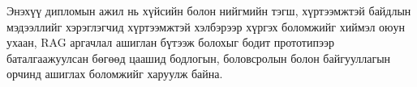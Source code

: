 Энэхүү дипломын ажил нь хүйсийн болон нийгмийн тэгш, хүртээмжтэй байдлын мэдээллийг хэрэглэгчид хүртээмжтэй хэлбэрээр хүргэх боломжийг хиймэл оюун ухаан, RAG аргачлал ашиглан бүтээж болохыг бодит прототипээр баталгаажуулсан бөгөөд цаашид бодлогын, боловсролын болон байгууллагын орчинд ашиглах боломжийг харуулж байна.
